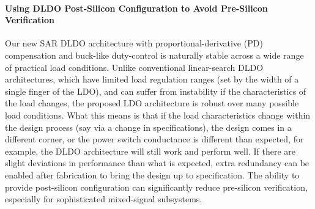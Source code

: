 \paragraph{Using DLDO Post-Silicon Configuration to Avoid Pre-Silicon Verification}
Our new SAR DLDO architecture with proportional-derivative (PD) compensation and buck-like
duty-control is naturally stable across a wide range of practical load
conditions. Unlike conventional linear-search DLDO architectures, which
have limited load regulation ranges (set by the width of a single finger
of the LDO), and can suffer from instability if the characteristics of
the load changes, the proposed LDO architecture is robust over many
possible load conditions. What this means is that if the load
characteristics change within the design process (say via a change in
specifications), the design comes in a different corner, or the power
switch conductance is different than expected, for example, the DLDO
architecture will still work and perform well. If there are slight
deviations in performance than what is expected, extra redundancy can be
enabled after fabrication to bring the design up to specification. The
ability to provide post-silicon configuration can significantly reduce
pre-silicon verification, especially for sophisticated mixed-signal
subsystems.

